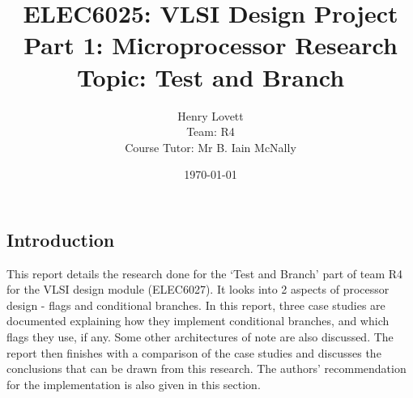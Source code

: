 \documentclass[12pt,a4paper]{article}
\title{ELEC6025: VLSI Design Project \\Part 1: Microprocessor Research\\Topic: Test and Branch}
\author{Henry Lovett\\ Team: R4\\Course Tutor: Mr B. Iain McNally}
\date{\today}
\begin{document}
\begin{titlepage}
\maketitle
\thispagestyle{empty}
\end{titlepage}

\tableofcontents
\clearpage
\begin{bibunit}[is-unsrt]
\section{Introduction}

This report details the research done for the `Test and Branch' part of team R4 for the VLSI design module (ELEC6027).
It looks into 2 aspects of processor design - flags and conditional branches. 
In this report, three case studies are documented explaining how they implement conditional branches, and which flags they use, if any.
Some other architectures of note are also discussed.
The report then finishes with a comparison of the case studies and discusses the conclusions that can be drawn from this research.
The authors' recommendation for the implementation is also given in this section.


%


\end{bibunit}
\end{document}
